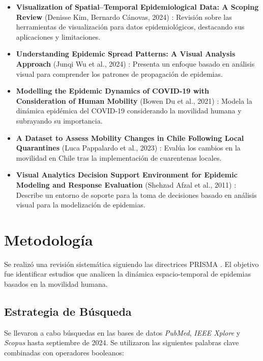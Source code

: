 \documentclass[sigconf]{acmart}
\begin{document}
\begin{itemize}
    \item \textbf{Visualization of Spatial–Temporal Epidemiological Data: A Scoping Review} (Denisse Kim, Bernardo Cánovas, 2024) \cite{kim2024scoping}: Revisión sobre las herramientas de visualización para datos epidemiológicos, destacando sus aplicaciones y limitaciones.

    \item \textbf{Understanding Epidemic Spread Patterns: A Visual Analysis Approach} (Junqi Wu et al., 2024) \cite{wu2024patterns}: Presenta un enfoque basado en análisis visual para comprender los patrones de propagación de epidemias.

    \item \textbf{Modelling the Epidemic Dynamics of COVID-19 with Consideration of Human Mobility} (Bowen Du et al., 2021) \cite{du2021dynamics}: Modela la dinámica epidémica del COVID-19 considerando la movilidad humana y subrayando su importancia.

    \item \textbf{A Dataset to Assess Mobility Changes in Chile Following Local Quarantines} (Luca Pappalardo et al., 2023) \cite{pappalardo2023dataset}: Evalúa los cambios en la movilidad en Chile tras la implementación de cuarentenas locales.

    \item \textbf{Visual Analytics Decision Support Environment for Epidemic Modeling and Response Evaluation} (Shehzad Afzal et al., 2011) \cite{afzal2011visual}: Describe un entorno de soporte para la toma de decisiones basado en análisis visual para la modelización de epidemias.
\end{itemize}

\section{Metodología}
Se realizó una revisión sistemática siguiendo las directrices PRISMA \cite{prisma2009}. El objetivo fue identificar estudios que analicen la dinámica espacio-temporal de epidemias basados en la movilidad humana.

\subsection{Estrategia de Búsqueda}

Se llevaron a cabo búsquedas en las bases de datos \textit{PubMed}, \textit{IEEE Xplore} y \textit{Scopus} hasta septiembre de 2024. Se utilizaron las siguientes palabras clave combinadas con operadores booleanos:
\end{document}
